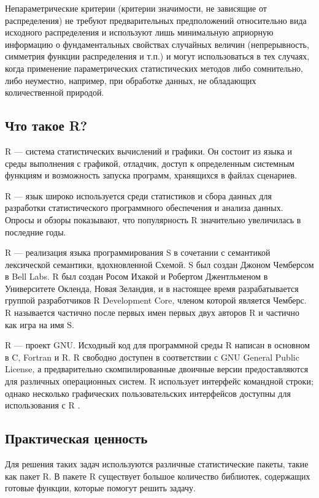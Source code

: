 \documentclass[14pt,a4paper]{scrartcl}
\begin{document}
    Непараметрические критерии (критерии значимости, не зависящие от распределения) не требуют предварительных предположений относительно вида исходного распределения и используют лишь минимальную априорную информацию о фундаментальных свойствах случайных величин (непрерывность, симметрия функции распределения и т.п.) и могут использоваться в тех случаях, когда применение параметрических статистических методов либо сомнительно, либо неуместно, например, при обработке данных, не обладающих количественной природой.

    \subsection{Что такое R?}
	R --- система статистических вычислений и графики. Он состоит из языка и среды выполнения с графикой, отладчик, доступ к определенным системным функциям и возможность запуска программ, хранящихся в файлах сценариев.

	R --- язык широко используется среди статистиков и сбора данных для разработки статистического программного обеспечения и анализа данных. Опросы и обзоры показывают, что популярность R значительно увеличилась в последние годы.

	R --- реализация языка программирования S в сочетании с семантикой лексической семантики, вдохновленной Схемой. S был создан Джоном Чемберсом в Bell Labs. R был создан Росом Ихакой и Робертом Джентльменом в Университете Окленда, Новая Зеландия, и в настоящее время разрабатывается группой разработчиков R Development Core, членом которой является Чемберс. R называется частично после первых имен первых двух авторов R и частично как игра на имя S.

	R --- проект GNU. Исходный код для программной среды R написан в основном в C, Fortran и R. R свободно доступен в соответствии с GNU General Public License, а предварительно скомпилированные двоичные версии предоставляются для различных операционных систем. R использует интерфейс командной строки; однако несколько графических пользовательских интерфейсов доступны для использования с R \cite{R-wiki}.

    \subsection{Практическая ценность}
    Для решения таких задач используются различные статистические пакеты, такие как пакет R. В пакете R существует большое количество библиотек, содержащих готовые функции, которые помогут решить задачу.
\end{document}
